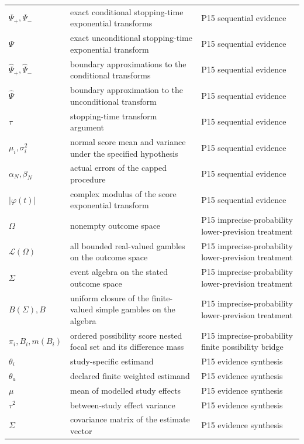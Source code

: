 \begin{longtable}{@{}p{}p{}p{}@{}}
\(\Psi_+,\allowbreak \Psi_-\) & exact conditional stopping-time exponential transforms & P15 sequential evidence \\
\(\Psi\) & exact unconditional stopping-time exponential transform & P15 sequential evidence \\
\(\widehat\Psi_+,\allowbreak \widehat\Psi_-\) & boundary approximations to the conditional transforms & P15 sequential evidence \\
\(\widehat\Psi\) & boundary approximation to the unconditional transform & P15 sequential evidence \\
\(\tau\) & stopping-time transform argument & P15 sequential evidence \\
\(\mu_i,\allowbreak \sigma_i^2\) & normal score mean and variance under the specified hypothesis & P15 sequential evidence \\
\(\alpha_N,\allowbreak \beta_N\) & actual errors of the capped procedure & P15 sequential evidence \\
\(|\varphi(t)|\) & complex modulus of the score exponential transform & P15 sequential evidence \\
\(\Omega\) & nonempty outcome space & P15 imprecise-\allowbreak{}probability lower-\allowbreak{}prevision treatment \\
\(\mathcal L(\Omega)\) & all bounded real-valued gambles on the outcome space & P15 imprecise-\allowbreak{}probability lower-\allowbreak{}prevision treatment \\
\(\Sigma\) & event algebra on the stated outcome space & P15 imprecise-\allowbreak{}probability lower-\allowbreak{}prevision treatment \\
\(B(\Sigma),\allowbreak B\) & uniform closure of the finite-valued simple gambles on the algebra & P15 imprecise-\allowbreak{}probability lower-\allowbreak{}prevision treatment \\
\(\pi_i,\allowbreak B_i,\allowbreak m(B_i)\) & ordered possibility score nested focal set and its difference mass & P15 imprecise-\allowbreak{}probability finite possibility bridge \\
\(\theta_i\) & study-specific estimand & P15 evidence synthesis \\
\(\theta_a\) & declared finite weighted estimand & P15 evidence synthesis \\
\(\mu\) & mean of modelled study effects & P15 evidence synthesis \\
\(\tau^2\) & between-study effect variance & P15 evidence synthesis \\
\(\Sigma\) & covariance matrix of the estimate vector & P15 evidence synthesis \\

\end{longtable}
